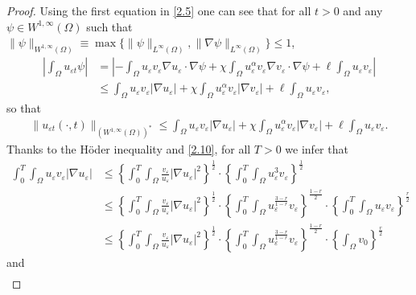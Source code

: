 \documentclass[12pt]{article}
\theoremstyle{plain}
\theoremstyle{definition}
\numberwithin{equation}{section}
\begin{document}
\begin{proof}
    Using the first equation in \eqref{2.5} one can see that for all $t>0$ and any $\psi\in W^{1,\infty}(\Omega) $ such that $\|\psi\|_{W^{1,\infty}(\Omega)}\equiv \max\{\|\psi\|_{L^{\infty}(\Omega)},\|\nabla \psi\|_{L^{\infty}(\Omega)}\}\leq 1$,
    \begin{align*}
   \left |\int_{\Omega}u_{\varepsilon t}\psi\right|&=\left|-\int_{\Omega}u_{\varepsilon}v_{\varepsilon}\nabla u_{\varepsilon}\cdot\nabla\psi +\chi \int_{\Omega}u_{\varepsilon}^{\alpha}v_{\varepsilon}\nabla v_{\varepsilon}\cdot\nabla\psi+\ell\int_{\Omega}u_{\varepsilon}v_{\varepsilon}\right|\\
    &\leq \int_{\Omega}u_{\varepsilon}v_{\varepsilon}|\nabla u_{\varepsilon}| +\chi \int_{\Omega}u_{\varepsilon}^{\alpha}v_{\varepsilon}|\nabla v_{\varepsilon}|+\ell\int_{\Omega}u_{\varepsilon}v_{\varepsilon},
    \end{align*}
 so that
 \begin{align}\label{4.2}
     \|u_{\varepsilon t}(\cdot,t)\|_{(W^{1,\infty}(\Omega))^*}\leq \int_{\Omega}u_{\varepsilon}v_{\varepsilon}|\nabla u_{\varepsilon}| +\chi \int_{\Omega}u_{\varepsilon}^{\alpha}v_{\varepsilon}|\nabla v_{\varepsilon}|+\ell\int_{\Omega}u_{\varepsilon}v_{\varepsilon}.
 \end{align}
 Thanks to the H\"{o}der inequality and \eqref{2.10}, for all $T>0$ we infer that
  \begin{align}\label{4.3}
     \int_0^{T}\int_{\Omega}u_{\varepsilon}v_{\varepsilon}|\nabla u_{\varepsilon}|
     &\leq\left\{\int_0^{T}\int_{\Omega}\frac{v_{\varepsilon}}{u_{\varepsilon}}|\nabla u_{\varepsilon}|^2\right\}^{\frac{1}{2}}\cdot \left\{\int_0^{T}\int_{\Omega}u_{\varepsilon}^3v_{\varepsilon} \right\}^{\frac{1}{2}}\nonumber\\
     &\leq\left\{\int_0^{T}\int_{\Omega}\frac{v_{\varepsilon}}{u_{\varepsilon}}|\nabla u_{\varepsilon}|^2\right\}^{\frac{1}{2}}\cdot \left\{\int_0^{T}\int_{\Omega}u_{\varepsilon}^{\frac{3-r}{1-r}}v_{\varepsilon} \right\}^{\frac{1-r}{2}}\cdot \left\{\int_0^{T}\int_{\Omega}u_{\varepsilon}v_{\varepsilon} \right\}^{\frac{r}{2}}\nonumber\\
     &\leq\left\{\int_0^{T}\int_{\Omega}\frac{v_{\varepsilon}}{u_{\varepsilon}}|\nabla u_{\varepsilon}|^2\right\}^{\frac{1}{2}}\cdot \left\{\int_0^{T}\int_{\Omega}u_{\varepsilon}^{\frac{3-r}{1-r}}v_{\varepsilon} \right\}^{\frac{1-r}{2}}\cdot \left\{\int_{\Omega}v_{0} \right\}^{\frac{r}{2}}
 \end{align}
 and
  \begin{align}\label{4.4}

\end{align}
\end{proof}
\end{document}
